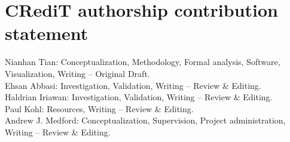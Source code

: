\documentclass[journal=jacsat,manuscript=article]{achemso}
\begin{document}
\section{CRediT authorship contribution statement}
Nianhan Tian: Conceptualization, Methodology, Formal analysis, Software, Visualization, Writing – Original Draft.  \\
Ehsan Abbasi: Investigation, Validation, Writing – Review \& Editing.  \\
Haldrian Iriawan: Investigation, Validation, Writing – Review \& Editing.  \\
Paul Kohl: Resources, Writing – Review \& Editing.  \\
Andrew J. Medford: Conceptualization, Supervision, Project administration, Writing – Review \& Editing.\\




\begin{acknowledgement}



\end{acknowledgement}

\begin{suppinfo}


\end{suppinfo}

% 

\end{document}
